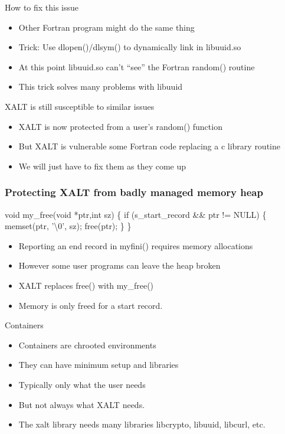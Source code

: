 \documentclass{beamer}
\begin{document}
\begin{frame}{How to fix this issue}
  \begin{itemize}
    \item Other Fortran program might do the same thing
    \item Trick: Use dlopen()/dlsym() to dynamically link in libuuid.so
    \item At this point libuuid.so can't ``see'' the Fortran random()
      routine
    \item This trick solves many problems with libuuid
  \end{itemize}
\end{frame}

\begin{frame}{XALT is still susceptible to similar issues}
  \begin{itemize}
    \item XALT is now protected from a user's random() function
    \item But XALT is vulnerable some Fortran code replacing a c
      library routine
    \item We will just have to fix them as they come up
  \end{itemize}
\end{frame}


\begin{frame}[fragile]
    \frametitle{Protecting XALT from badly managed memory heap}
 {\small
    \begin{semiverbatim}
void my\_free(void *ptr,int sz)
\{
  if (s\_start\_record \&\& ptr != NULL)
    \{
      memset(ptr, '\textbackslash{}0', sz);
      free(ptr);
    \}
\}
    \end{semiverbatim}
}
  \begin{itemize}
    \item Reporting an end record in myfini() requires memory
      allocations
    \item However some user programs can leave the heap broken
    \item XALT replaces free() with my\_free()
    \item Memory is only freed for a start record.
  \end{itemize}
\end{frame}

\begin{frame}{Containers}
  \begin{itemize}
    \item Containers are chrooted environments
    \item They can have minimum setup and libraries
    \item Typically only what the user needs
    \item But not always what XALT needs.
    \item The xalt library needs many libraries libcrypto, libuuid,
      libcurl, etc.
  \end{itemize}
\end{frame}
\end{document}
